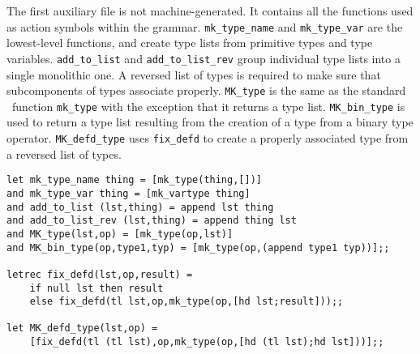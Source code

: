 The first auxiliary file is not machine-generated.  It contains all the
functions used as action symbols within the grammar.  \verb"mk_type_name" and
\verb"mk_type_var" are the lowest-level functions, and create type lists from
primitive types and type variables.  \verb"add_to_list" and 
\verb"add_to_list_rev" group individual type lists into a single monolithic 
one.  A reversed list of types is required to make sure that subcomponents of
types associate properly.  \verb"MK_type" is the same as the standard \ML\
function \verb"mk_type" with the exception that it returns a type list.
\verb"MK_bin_type" is used to return a type list resulting from the creation
of a type from a binary type operator.  \verb"MK_defd_type" uses 
\verb"fix_defd" to create a properly associated type from a reversed list of
types.
\begin{center}
\begin{boxed}
\begin{verbatim}
let mk_type_name thing = [mk_type(thing,[])]
and mk_type_var thing = [mk_vartype thing]
and add_to_list (lst,thing) = append lst thing
and add_to_list_rev (lst,thing) = append thing lst
and MK_type(lst,op) = [mk_type(op,lst)]
and MK_bin_type(op,type1,typ) = [mk_type(op,(append type1 typ))];;

letrec fix_defd(lst,op,result) =
    if null lst then result
    else fix_defd(tl lst,op,mk_type(op,[hd lst;result]));;

let MK_defd_type(lst,op) =
    [fix_defd(tl (tl lst),op,mk_type(op,[hd (tl lst);hd lst]))];;
\end{verbatim}
\end{boxed}
\end{center}

